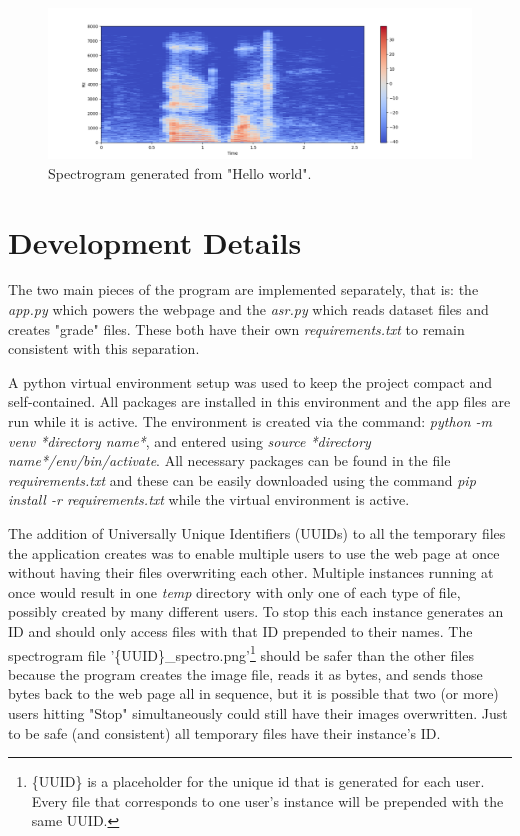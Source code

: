 \documentclass[12pt, letterpaper]{article}
\begin{document}
\begin{figure}[h!]
    \centering
    \includegraphics[scale=0.33]{images/spectro.pdf}
    \caption{Spectrogram generated from "Hello world".}
\end{figure}

\newpage%


\section*{Development Details} \label{development}
The two main pieces of the program are implemented separately, that is: the \textit{app.py} which powers the webpage and the \textit{asr.py} which reads dataset files and creates "grade" files. These both have their own \textit{requirements.txt} to remain consistent with this separation. 

A python virtual environment setup was used to keep the project compact and self-contained. All packages are installed in this environment and the app files are run while it is active. The environment is created via the command: \textit{python -m venv *directory name*}, and entered using \textit{source *directory name*/env/bin/activate}. All necessary packages can be found in the file \textit{requirements.txt} and these can be easily downloaded using the command \textit{pip install -r requirements.txt} while the virtual environment is active.

The addition of Universally Unique Identifiers (UUIDs) to all the temporary files the application creates was to enable multiple users to use the web page at once without having their files overwriting each other. Multiple instances running at once would result in one \textit{temp} directory with only one of each type of file, possibly created by many different users. To stop this each instance generates an ID and should only access files with that ID prepended to their names. The spectrogram file '\{UUID\}\_spectro.png'\footnote{\{UUID\} is a placeholder for the unique id that is generated for each user. Every file that corresponds to one user's instance will be prepended with the same UUID.} should be safer than the other files because the program creates the image file, reads it as bytes, and sends those bytes back to the web page all in sequence, but it is possible that two (or more) users hitting "Stop" simultaneously could still have their images overwritten. Just to be safe  (and consistent) all temporary files have their instance's ID.
\end{document}
